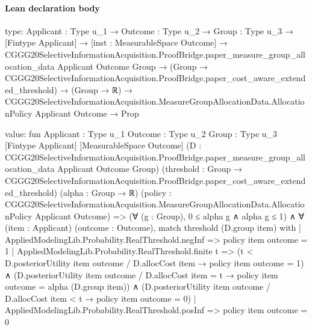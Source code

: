 \documentclass[10pt]{article}
\begin{document}
\paragraph{Lean declaration body}
\begin{ReviewVerbatim}
type:
{Applicant : Type u_1} →
  {Outcome : Type u_2} →
    {Group : Type u_3} →
      [Fintype Applicant] →
        [inst : MeasurableSpace Outcome] →
          CGGG20SelectiveInformationAcquisition.ProofBridge.paper_measure_group_allocation_data Applicant Outcome
              Group →
            (Group → CGGG20SelectiveInformationAcquisition.ProofBridge.paper_cost_aware_extended_threshold) →
              (Group → ℝ) →
                CGGG20SelectiveInformationAcquisition.MeasureGroupAllocationData.AllocationPolicy Applicant Outcome →
                  Prop

value:
fun {Applicant : Type u_1} {Outcome : Type u_2} {Group : Type u_3} [Fintype Applicant] [MeasurableSpace Outcome]
    (D : CGGG20SelectiveInformationAcquisition.ProofBridge.paper_measure_group_allocation_data Applicant Outcome Group)
    (threshold : Group → CGGG20SelectiveInformationAcquisition.ProofBridge.paper_cost_aware_extended_threshold)
    (alpha : Group → ℝ)
    (policy : CGGG20SelectiveInformationAcquisition.MeasureGroupAllocationData.AllocationPolicy Applicant Outcome) =>
  (∀ (g : Group), 0 ≤ alpha g ∧ alpha g ≤ 1) ∧
    ∀ (item : Applicant) (outcome : Outcome),
      match threshold (D.group item) with
      | AppliedModelingLib.Probability.RealThreshold.negInf => policy item outcome = 1
      | AppliedModelingLib.Probability.RealThreshold.finite t =>
        (t < D.posteriorUtility item outcome / D.allocCost item → policy item outcome = 1) ∧
          (D.posteriorUtility item outcome / D.allocCost item = t → policy item outcome = alpha (D.group item)) ∧
            (D.posteriorUtility item outcome / D.allocCost item < t → policy item outcome = 0)
      | AppliedModelingLib.Probability.RealThreshold.posInf => policy item outcome = 0
\end{ReviewVerbatim}
\end{document}
